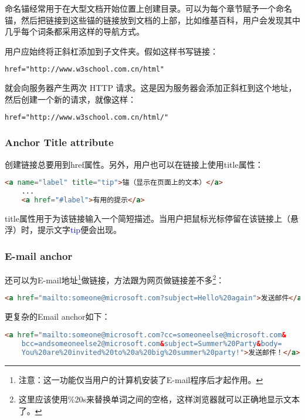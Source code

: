 命名锚经常用于在大型文档开始位置上创建目录。可以为每个章节赋予一个命名锚，然后把链接到这些锚的链接放到文档的上部，比如维基百科，用户会发现其中几乎每个词条都采用这样的导航方式。

用户应始终将正斜杠添加到子文件夹。假如这样书写链接：

\begin{lstlisting}[language=HTML]
	href="http://www.w3school.com.cn/html"
\end{lstlisting}


就会向服务器产生两次 HTTP 请求。这是因为服务器会添加正斜杠到这个地址，然后创建一个新的请求，就像这样：

\begin{lstlisting}[language=HTML]
	href="http://www.w3school.com.cn/html/"
\end{lstlisting}


\subsubsection{Anchor Title attribute}

创建链接总要用到href属性。另外，用户也可以在链接上使用title属性：

\begin{lstlisting}[language=HTML]
	<a name="label" title="tip">锚（显示在页面上的文本）</a>
	...
	<a href="#label">有用的提示</a>
\end{lstlisting}

title属性用于为该链接输入一个简短描述。当用户把鼠标光标停留在该链接上（悬浮）时，提示文字\textcolor{Blue}{tip}便会出现。


\subsubsection{E-mail anchor}

还可以为E-mail地址\footnote{注意：这一功能仅当用户的计算机安装了E-mail程序后才起作用。}做链接，方法跟为网页做链接差不多\footnote{这里应该使用\%20s来替换单词之间的空格，这样浏览器就可以正确地显示文本了。}：

\begin{lstlisting}[language=HTML]
	<a href="mailto:someone@microsoft.com?subject=Hello%20again">发送邮件</a>
\end{lstlisting}

更复杂的Email anchor如下：

\begin{lstlisting}[language=HTML]
	<a href="mailto:someone@microsoft.com?cc=someoneelse@microsoft.com&
	bcc=andsomeoneelse2@microsoft.com&subject=Summer%20Party&body=
	You%20are%20invited%20to%20a%20big%20summer%20party!">发送邮件！</a>
\end{lstlisting}

